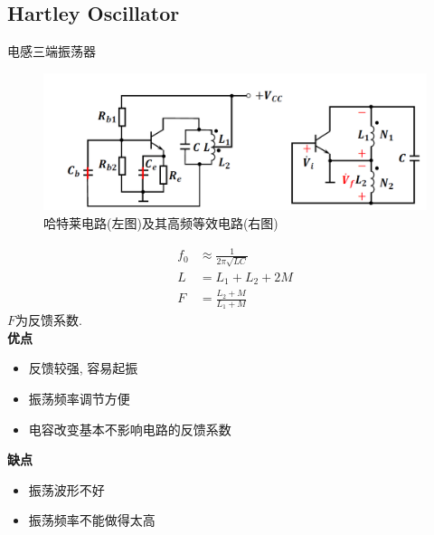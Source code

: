 \documentclass[a4paper]{report}
\begin{document}
\subsection{Hartley Oscillator}
电感三端振荡器
\begin{figure}[H]
\centering
\includegraphics[width=1\textwidth]{osc_hartley.png}
\caption{哈特莱电路(左图)及其高频等效电路(右图)}
\end{figure}
\begin{align*}
  f_0&\approx \frac{1}{2\pi\sqrt{LC}}\\
  L&=L_1+L_2+2M\\
  F&=\frac{L_2+M}{L_1+M}
\end{align*}
$F$为反馈系数. \\
\textbf{优点}
\begin{itemize}
  \item 反馈较强, 容易起振
  \item 振荡频率调节方便
  \item 电容改变基本不影响电路的反馈系数
\end{itemize}
\textbf{缺点}
\begin{itemize}
  \item 振荡波形不好
  \item 振荡频率不能做得太高 
\end{itemize}
\end{document}
